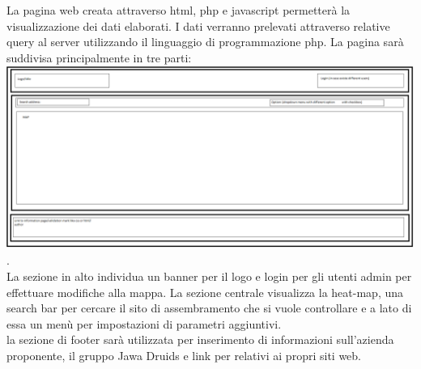 La pagina web creata attraverso html, php e javascript permetterà la visualizzazione dei dati elaborati. I dati verranno prelevati attraverso relative query al server utilizzando il linguaggio di programmazione php.
La pagina sarà suddivisa principalmente in tre parti: \includegraphics{../immagini/templateHtmlGDP.png}.\\
La sezione in alto individua un banner per il logo e login per gli utenti admin per effettuare modifiche alla mappa.
La sezione centrale visualizza la heat-map, una search bar per cercare il sito di assembramento che si vuole controllare e a lato di essa un menù per impostazioni di parametri aggiuntivi.\\
la sezione di footer sarà utilizzata per inserimento di informazioni sull'azienda proponente, il gruppo Jawa Druids e link per relativi ai propri siti web.